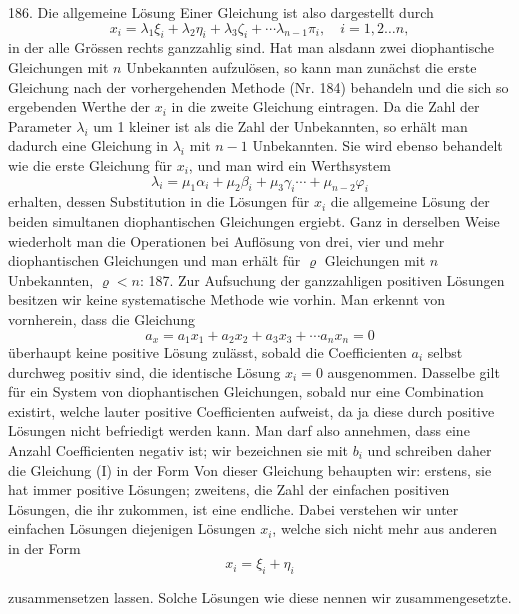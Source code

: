 186.  Die allgemeine Lösung Einer Gleichung ist also dargestellt durch
\[ x_i = \lambda_1 \xi_i + \lambda_2 \eta_i + \lambda_3 \zeta_i + \cdots \lambda_{n-1} \pi_i, \quad i = 1, 2 \ldots n, \]
in der alle Grössen rechts ganzzahlig sind. Hat man alsdann zwei diophantische Gleichungen mit $n$ Unbekannten aufzulösen, so kann man zunächst die erste Gleichung nach der vorhergehenden Methode (Nr. 184) behandeln und die sich so ergebenden Werthe der $x_i$ in die zweite Gleichung eintragen. Da die Zahl der Parameter $\lambda_i$ um 1 kleiner ist als die Zahl der Unbekannten, so erhält man dadurch eine Gleichung in $\lambda_i$ mit $n - 1$ Unbekannten. Sie wird ebenso behandelt wie die erste Gleichung für $x_i$, und man wird ein Werthsystem
\[ \lambda_i = \mu_1 \alpha_i + \mu_2 \beta_i + \mu_3 \gamma_i \cdots + \mu_{n-2} \varphi_i \]
erhalten, dessen Substitution in die Lösungen für $x_i$ die allgemeine Lösung der beiden simultanen diophantischen Gleichungen ergiebt. Ganz in derselben Weise wiederholt man die Operationen bei Auflösung von drei, vier und mehr diophantischen Gleichungen und man erhält für $\varrho$ Gleichungen mit $n$ Unbekannten, $\varrho < n$:
187.  Zur Aufsuchung der ganzzahligen positiven Lösungen besitzen wir keine systematische Methode wie vorhin. Man erkennt von vornherein, dass die Gleichung
\[ a_x = a_1 x_1 + a_2 x_2 + a_3 x_3 + \cdots a_n x_n = 0 \]
überhaupt keine positive Lösung zulässt, sobald die Coefficienten $a_i$ selbst durchweg positiv sind, die identische Lösung $x_i = 0$ ausgenommen. Dasselbe gilt für ein System von diophantischen Gleichungen, sobald nur eine Combination existirt, welche lauter positive Coefficienten aufweist, da ja diese durch positive Lösungen nicht befriedigt werden kann. Man darf also annehmen, dass eine Anzahl Coefficienten negativ ist; wir bezeichnen sie mit $b_i$ und schreiben daher die Gleichung (I) in der Form
Von dieser Gleichung behaupten wir: erstens, sie hat immer positive Lösungen; zweitens, die Zahl der einfachen positiven Lösungen, die ihr zukommen, ist eine endliche. Dabei verstehen wir unter einfachen Lösungen diejenigen Lösungen $x_i$, welche sich nicht mehr aus anderen in der Form
\[ x_i = \xi_i + \eta_i \]


zusammensetzen lassen. Solche Lösungen wie diese nennen wir zusammengesetzte.

